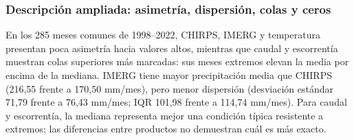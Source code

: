\documentclass[10pt,a4paper]{article}
\begin{document}
\subsubsection*{Descripción ampliada: asimetría, dispersión, colas y ceros}
En los 285 meses comunes de 1998--2022, CHIRPS, IMERG y temperatura presentan poca asimetría hacia valores altos, mientras que caudal y escorrentía muestran colas superiores más marcadas: sus meses extremos elevan la media por encima de la mediana. IMERG tiene mayor precipitación media que CHIRPS (216,55 frente a 170,50 mm/mes), pero menor dispersión (desviación estándar 71,79 frente a 76,43 mm/mes; IQR 101,98 frente a 114,74 mm/mes). Para caudal y escorrentía, la mediana representa mejor una condición típica resistente a extremos; las diferencias entre productos no demuestran cuál es más exacto.
\end{document}
